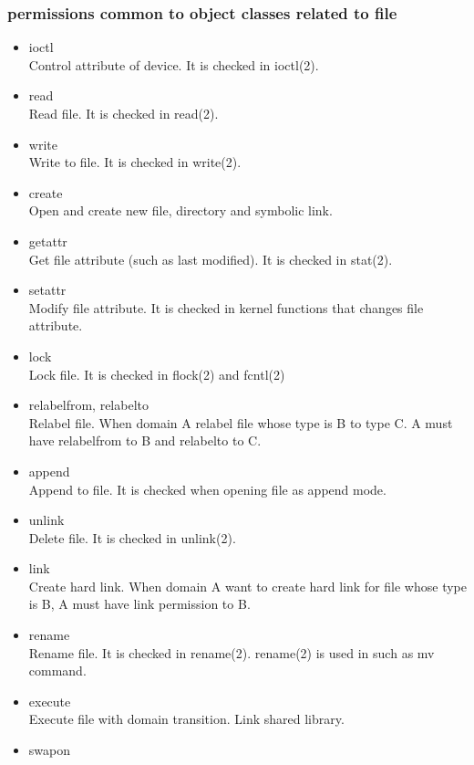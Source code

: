 \documentclass{article}
\begin{document}
\subsubsection{permissions common to object classes related to file}
\begin{itemize}
 \item ioctl\\
       Control attribute of device. It is checked in ioctl(2).
 \item read\\
       Read file. It is checked in read(2).
 \item  write\\
       Write to file. It is checked in write(2).
 \item create \\
       Open and create new file, directory and symbolic link.        
 \item  getattr\\
       Get file attribute (such as last modified). It is checked in stat(2).
 \item setattr\\
       Modify file attribute.  It is checked in kernel functions that
       changes file attribute.
 \item  lock\\
       Lock file. It is checked in flock(2) and fcntl(2)
 \item  relabelfrom, relabelto\\
       Relabel file. When domain A relabel file whose type is B to type
       C. A must have relabelfrom to B and relabelto to C.
 \item append\\
       Append to file. It is checked when opening file as append mode.
 \item  unlink\\
       Delete file. It is checked in  unlink(2).
 \item  link\\
       Create hard link. When domain A want to create hard link for file
       whose type is B, A must have link permission to B.
 \item rename\\
       Rename file. It is checked in rename(2). rename(2) is used in
       such as mv command.
 \item execute\\
       Execute file with domain transition. Link shared library.
 \item  swapon\\ 

\end{itemize}
\end{document}
